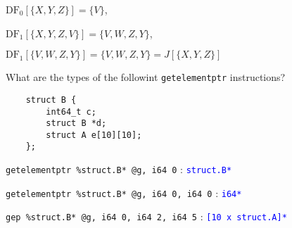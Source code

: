 $\text{DF}_0[\{X, Y, Z\}] = \{V\}$, 

$\text{DF}_1[\{X, Y, Z, V\}] = \{V, W, Z, Y\}$, 

$\text{DF}_1[\{V, W, Z, Y\}] = \{V, W, Z, Y\} = J[\{X, Y, Z\}]$

\hrulefill

What are the types of the followint \texttt{getelementptr} instructions?
\begin{lstlisting}
	struct B {
		int64_t c;
		struct B *d;
		struct A e[10][10];
	}; 
\end{lstlisting}

\texttt{getelementptr \%struct.B* @g, i64 0} : \textcolor{blue}{\texttt{struct.B*}}

\texttt{getelementptr \%struct.B* @g, i64 0, i64 0} : \textcolor{blue}{\texttt{i64*}}

\texttt{gep \%struct.B* @g, i64 0, i64 2, i64 5} : \textcolor{blue}{\texttt{[10 x struct.A]*}}

\hrulefill


